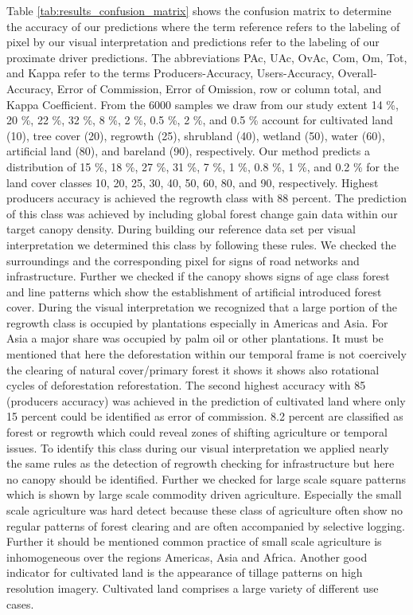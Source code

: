 			 Table \ref{tab:results_confusion_matrix} shows the confusion matrix to determine the accuracy of our predictions where the term reference refers to the labeling of pixel by our visual interpretation and predictions refer to the labeling of our proximate driver predictions. The abbreviations PAc, UAc, OvAc, Com, Om, Tot, and Kappa refer to the terms Producers-Accuracy, Users-Accuracy, Overall-Accuracy, Error of Commission, Error of Omission, row or column total, and Kappa Coefficient. From the 6000 samples we draw from our study extent 14 \%, 20 \%, 22 \%, 32 \%, 8 \%, 2 \%, 0.5 \%, 2 \%, and 0.5 \% account for cultivated land (10), tree cover (20), regrowth (25), shrubland (40), wetland (50), water (60), artificial land (80), and bareland (90), respectively. Our method predicts a distribution of 15 \%, 18 \%, 27 \%, 31 \%, 7 \%, 1 \%, 0.8 \%, 1 \%, and 0.2 \% for the land cover classes 10, 20, 25, 30, 40, 50, 60, 80, and 90, respectively.
			Highest producers accuracy is achieved the regrowth class with 88 percent. The prediction of this class was achieved by including global forest change gain data within our target canopy density. During building our reference data set per visual interpretation we determined this class by following these rules. We checked the surroundings and the corresponding pixel for signs of road networks and infrastructure. Further we checked if the canopy shows signs of age class forest and line patterns which show the establishment of artificial introduced forest cover. During the visual interpretation we recognized that a large portion of the regrowth class is occupied by plantations especially in Americas and Asia. For Asia a major share was occupied by palm oil or other plantations. It must be mentioned that here the deforestation within our temporal frame is not coercively the clearing of natural cover/primary forest it shows it shows also rotational cycles of deforestation reforestation.
			The second highest accuracy with 85 (producers accuracy) was achieved in the prediction of cultivated land where only 15 percent could be identified as error of commission. 8.2 percent are classified as forest or regrowth which could reveal zones of shifting agriculture or temporal issues. To identify this class during our visual interpretation we applied nearly the same rules as the detection of regrowth checking for infrastructure but here no canopy should be identified. Further we checked for large scale square patterns which is shown by large scale commodity driven agriculture. Especially the small scale agriculture was hard detect because these class of agriculture often show no regular patterns of forest clearing and are often accompanied by selective logging. Further it should be mentioned common practice of small scale agriculture is inhomogeneous over the regions Americas, Asia and Africa. Another good indicator for cultivated land is the appearance of tillage patterns on high resolution imagery. Cultivated land comprises a large variety of different use cases. 
